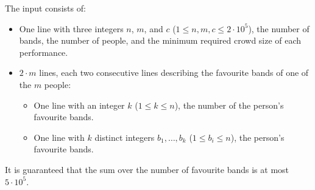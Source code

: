 
	The input consists of:
	\begin{itemize}
		\item One line with three integers $n$, $m$, and $c$ ($1 \leq n, m, c \leq 2\cdot10^5$), the number of bands, the number of people, and the minimum required crowd size of each performance.
        \item $2 \cdot m$ lines, each two consecutive lines describing the favourite bands of one of the $m$ people: 
            \begin{itemize}
                \item One line with an integer $k$ ($1 \leq k \leq n$), the number of the person's favourite bands.
                \item One line with $k$ distinct integers $b_1, \dots, b_k$ ($1 \leq b_i \leq n$), the person's favourite bands.
            \end{itemize}
	\end{itemize}
	It is guaranteed that the sum over the number of favourite bands is at most $5\cdot10^5$.
